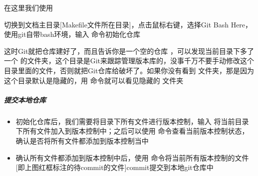 \documentclass[a4paper,10pt,english]{sphinxmanual}
\begin{document}
在这里我们使用 

切换到文档主目录{[}Makefile文件所在目录{]}，点击鼠标右键，选择Git Bash Here，使用git自带bash环境，输入  命令初始化仓库

\begin{figure}[htbp]
\centering

\noindent{}
\end{figure}

\begin{figure}[htbp]
\centering

\noindent{}
\end{figure}

这时Git就把仓库建好了，而且告诉你是一个空的仓库  ，可以发现当前目录下多了一个  的文件夹，这个目录是Git来跟踪管理版本库的，没事千万不要手动修改这个目录里面的文件，否则就把Git仓库给破坏了。如果你没有看到  文件夹，那是因为这个目录默认是隐藏的，用  命令就可以看见隐藏的  文件夹

\begin{figure}[htbp]
\centering

\noindent{}
\end{figure}


\subparagraph{提交本地仓库}
\label{\detokenize{sphinx/2-collocation/1-github/1-InitLocal:id8}}\begin{itemize}
\item {} 
初始化仓库后，我们需要将目录下所有文件进行版本控制，输入  将当前目录下所有文件加入到版本控制中；之后可以使用  命令查看当前版本控制状态，确认是否将所有文件都添加到版本控制当中

\end{itemize}

\begin{figure}[htbp]
\centering

\noindent{}
\end{figure}
\begin{itemize}
\item {} 
确认所有文件都添加到版本控制中后，使用  命令将当前所有版本控制的文件{[}即上图红框标注的待commit的文件{]}commit提交到本地git仓库中

\end{itemize}
\end{document}
